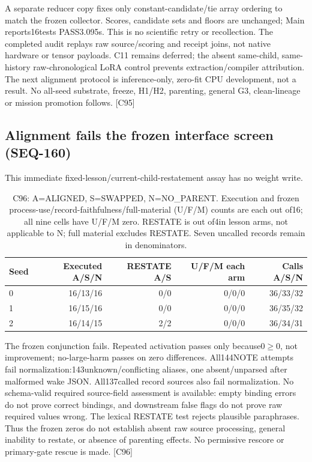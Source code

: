 \documentclass{article}
\begin{document}
A separate reducer copy fixes only constant-candidate/tie array ordering to
match the frozen collector. Scores, candidate sets and floors are unchanged;
Main reports16tests PASS3.095s. This is no scientific retry or recollection.
The completed audit replays raw source/scoring and receipt joins, not native
hardware or tensor payloads. C11 remains deferred; the absent same-child,
same-history raw-chronological LoRA control prevents extraction/compiler
attribution. The next alignment protocol is inference-only, zero-fit CPU
development, not a result. No all-seed substrate, freeze, H1/H2, parenting,
general G3, clean-lineage or mission promotion follows. [C95]


\subsection{Alignment fails the frozen interface screen (SEQ-160)}
\label{sec:seq160-alignment}
This immediate fixed-lesson/current-child-restatement assay has no weight write.
\begin{table}[htbp]
\centering\small
\begin{tabular}{lrrrr}
\toprule
Seed & Executed A/S/N & RESTATE A/S & U/F/M each arm & Calls A/S/N \\
\midrule
0 & 16/13/16 & 0/0 & 0/0/0 & 36/33/32 \\
1 & 16/15/16 & 0/0 & 0/0/0 & 36/35/32 \\
2 & 16/14/15 & 2/2 & 0/0/0 & 36/34/31 \\
\bottomrule
\end{tabular}
\caption{C96: A=ALIGNED, S=SWAPPED, N=NO\_PARENT. Execution and frozen
process-use/record-faithfulness/full-material (U/F/M) counts are each out of16;
all nine cells have U/F/M zero. RESTATE is out of4in lesson arms, not applicable
to N; full material excludes RESTATE. Seven uncalled records remain in denominators.}
\label{tab:seq160-alignment}
\end{table}
The frozen conjunction fails. Repeated activation passes only because0$\geq$0,
not improvement; no-large-harm passes on zero differences. All144NOTE attempts
fail normalization:143unknown/conflicting aliases, one absent/unparsed after
malformed wake JSON. All137called record sources also fail normalization.
No schema-valid required source-field assessment is available: empty binding
errors do not prove correct bindings, and downstream false flags do not prove
raw required values wrong. The lexical RESTATE test rejects plausible paraphrases.
Thus the frozen zeros do not establish absent raw source processing, general
inability to restate, or absence of parenting effects. No permissive rescore
or primary-gate rescue is made. [C96]
\end{document}
